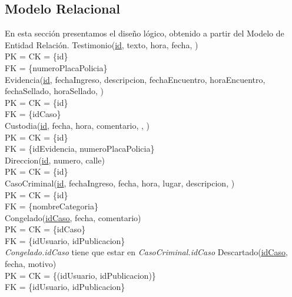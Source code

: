 \documentclass[10pt,a4paper]{article}
\begin{document}
\subsection{Modelo Relacional}
En esta sección presentamos el diseño lógico, obtenido a partir del Modelo de Entidad Relación. 
\newline
\newline
Testimonio(\underline{id}, texto, hora, fecha, )\\
	PK = CK = \{id\}\\ 
	FK = \{numeroPlacaPolicia\}\\ 
\newline
Evidencia(\underline{id}, fechaIngreso, descripcion, fechaEncuentro, horaEncuentro, fechaSellado, horaSellado, )\\ 
	PK = CK = \{id\} \\
	FK = \{idCaso\}\\ 
\newline
Custodia(\underline{id}, fecha, hora, comentario, , )\\ 
	PK = CK = \{id\} \\
	FK = \{idEvidencia, numeroPlacaPolicia\}\\ 
\newline
Direccion(\underline{id}, numero, calle)\\ 
	PK = CK = \{id\}\\ 
\newline
CasoCriminal(\underline{id}, fechaIngreso, fecha, hora, lugar, descripcion, )\\ 
	PK = CK = \{id\}\\ 
	FK = \{nombreCategoria\}\\ 
\newline
Congelado(\underline{\underline{idCaso}}, fecha, comentario)\\ 
	PK = CK = \{idCaso\}\\ 
	FK = \{idUsuario, idPublicacion\}\\ 
\newline
\textit{Congelado.idCaso} tiene que estar en \textit{CasoCriminal.idCaso}
\newline
\newline
Descartado(\underline{\underline{idCaso}}, fecha, motivo)\\ 
	PK = CK = \{(idUsuario, idPublicacion)\}\\ 
	FK = \{idUsuario, idPublicacion\}\\ 	
\end{document}
